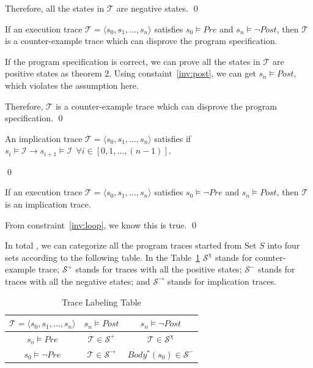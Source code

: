 Therefore, all the states in $\mathcal{T}$ are negative states. \hfill \qed


\begin{theorem}
If an execution trace $\mathcal{T} = \langle s_0, s_1, ..., s_n\rangle$ satisfies $s_0 \models Pre$ and $s_n \models \neg Post$,
then $\mathcal{T}$ is a counter-example trace which can disprove the program specification.
\end{theorem}

If the program specification is correct,
we can prove all the states in $\mathcal{T}$ are positive states as theorem 2.
Using constaint~\ref{inv:post}, we can get $s_n \models Post$, which violates the assumption here.

Therefore, $\mathcal{T}$ is a counter-example trace which can disprove the program specification. \hfill \qed

\begin{definition}
An implication trace $\mathcal{T} = \langle s_0, s_1, ..., s_n\rangle$ satisfies if $s_i \models \mathcal{I} \rightarrow s_{i+1} \models \mathcal{I} ~~\forall i \in [0, 1, ..., (n-1)]$.
\end{definition} \hfill \qed

\begin{theorem}
If an execution trace $\mathcal{T} = \langle s_0, s_1, ..., s_n\rangle$ satisfies $s_0 \models \neg Pre$ and $s_n \models Post$,
then $\mathcal{T}$ is an implication trace.
\end{theorem}
From constraint~\ref{inv:loop}, we know this is true. \hfill \qed




In total , we can categorize all the program traces
started from Set $S$ into four sets according to the following table.
In the Table~\ref{tab:labeling}
$\mathcal{S}^\chi$ stands for counter-example trace;
$\mathcal{S}^+$ stands for traces with all the positive states;
$\mathcal{S}^-$ stands for traces with all the negative states; 
and $\mathcal{S}^\rightarrow$ stands for implication traces.

\begin{table}[htb]
\centering
\begin{tabular}[float]{|c|c|c|}
\hline
$\mathcal{T} = \langle s_0, s_1, ..., s_n\rangle$ & $s_n \models Post$            & $s_n \models \neg Post$\\
\hline
$s_o \models Pre$                 & $\mathcal{T} \in \mathcal{S}^+$       		  & $\mathcal{T} \in \mathcal{S}^\chi$\\
\hline
$s_0 \models \neg Pre$            & $\mathcal{T} \in \mathcal{S}^\rightarrow$     & $Body^*(s_0) \in \mathcal{S}^-$\\
\hline
\end{tabular}
\caption{Trace Labeling Table}
\label{tab:labeling}
\end{table}

